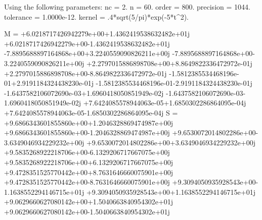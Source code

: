 Using the following parameters:
        nc = 2.
         n = 60.
     order = 800.
 precision = 1044.
 tolerance = 1.0000e-12.
    kernel = .4*sqrt(5/pi)*exp(-5*t^2).

M = 
+6.0218717426942279e+00+1.4362419538632482e+01j
+6.0218717426942279e+00-1.4362419538632482e+01j
-7.8895688897164868e+00+3.2240559090826211e+00j
-7.8895688897164868e+00-3.2240559090826211e+00j
+2.2797015886898708e+00+8.8649822336472972e-01j
+2.2797015886898708e+00-8.8649822336472972e-01j
-1.5812385534468196e-01+2.9191184324438230e-01j
-1.5812385534468196e-01-2.9191184324438230e-01j
-1.6437582106072690e-03+1.6960418050851949e-02j
-1.6437582106072690e-03-1.6960418050851949e-02j
+7.6424085578944063e-05+1.6850302286864095e-04j
+7.6424085578944063e-05-1.6850302286864095e-04j
S = 
+9.6866343601855860e+00+1.2046328869474987e+00j
+9.6866343601855860e+00-1.2046328869474987e+00j
+9.6530072014802286e+00-3.6349046934229232e+00j
+9.6530072014802286e+00+3.6349046934229232e+00j
+9.5835268922218706e+00-6.1329206717667075e+00j
+9.5835268922218706e+00+6.1329206717667075e+00j
+9.4728351525770442e+00+8.7631646660075901e+00j
+9.4728351525770442e+00-8.7631646660075901e+00j
+9.3094050935928543e+00-1.1638552294146715e+01j
+9.3094050935928543e+00+1.1638552294146715e+01j
+9.0629660627080142e+00+1.5040663840954302e+01j
+9.0629660627080142e+00-1.5040663840954302e+01j


